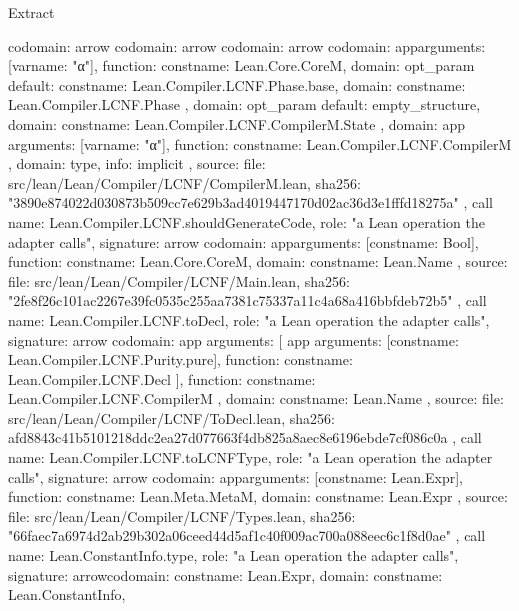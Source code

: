 \begin{lexlean}{Extract}
\begin{toolingmodule}
{{{        codomain: arrow{
          codomain: arrow{
            codomain: arrow{
              codomain: app{arguments: [var{name: "α"}], function: const{name: Lean.Core.CoreM}},
              domain: opt_param{
                default: const{name: Lean.Compiler.LCNF.Phase.base},
                domain: const{name: Lean.Compiler.LCNF.Phase}
              }
            },
            domain: opt_param{
              default: empty_structure{},
              domain: const{name: Lean.Compiler.LCNF.CompilerM.State}
            }
          },
          domain: app{
            arguments: [var{name: "α"}],
            function: const{name: Lean.Compiler.LCNF.CompilerM}
          }
        },
        domain: type{},
        info: implicit
      },
      source: {
        file: src/lean/Lean/Compiler/LCNF/CompilerM.lean,
        sha256: "3890e874022d030873b509cc7e629b3ad4019447170d02ac36d3e1fffd18275a"
      }
    },
    call{
      name: Lean.Compiler.LCNF.shouldGenerateCode,
      role: "a Lean operation the adapter calls",
      signature: arrow{
        codomain: app{arguments: [const{name: Bool}], function: const{name: Lean.Core.CoreM}},
        domain: const{name: Lean.Name}
      },
      source: {
        file: src/lean/Lean/Compiler/LCNF/Main.lean,
        sha256: "2fe8f26c101ac2267e39fc0535c255aa7381c75337a11c4a68a416bbfdeb72b5"
      }
    },
    call{
      name: Lean.Compiler.LCNF.toDecl,
      role: "a Lean operation the adapter calls",
      signature: arrow{
        codomain: app{
          arguments: [
            app{
              arguments: [const{name: Lean.Compiler.LCNF.Purity.pure}],
              function: const{name: Lean.Compiler.LCNF.Decl}
            }
          ],
          function: const{name: Lean.Compiler.LCNF.CompilerM}
        },
        domain: const{name: Lean.Name}
      },
      source: {
        file: src/lean/Lean/Compiler/LCNF/ToDecl.lean,
        sha256: afd8843c41b5101218ddc2ea27d077663f4db825a8aec8e6196ebde7cf086c0a
      }
    },
    call{
      name: Lean.Compiler.LCNF.toLCNFType,
      role: "a Lean operation the adapter calls",
      signature: arrow{
        codomain: app{arguments: [const{name: Lean.Expr}], function: const{name: Lean.Meta.MetaM}},
        domain: const{name: Lean.Expr}
      },
      source: {
        file: src/lean/Lean/Compiler/LCNF/Types.lean,
        sha256: "66faec7a6974d2ab29b302a06ceed44d5af1c40f009ac700a088eec6c1f8d0ae"
      }
    },
    call{
      name: Lean.ConstantInfo.type,
      role: "a Lean operation the adapter calls",
      signature: arrow{codomain: const{name: Lean.Expr}, domain: const{name: Lean.ConstantInfo}},
}}
\end{toolingmodule}
\end{lexlean}
